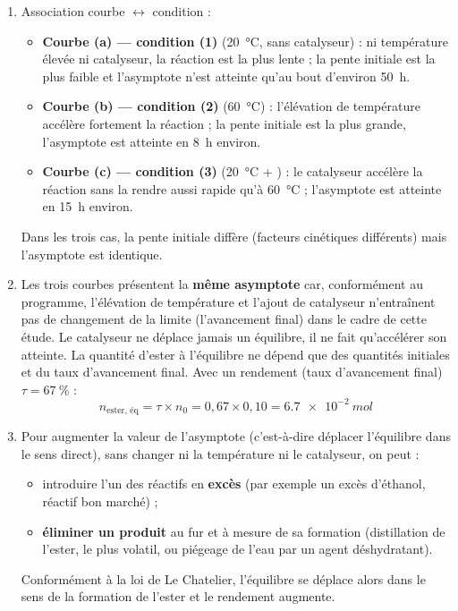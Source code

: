 \documentclass[11pt]{article}
\begin{document}
\begin{corrige}
\begin{enumerate}
\item Association courbe $\leftrightarrow$ condition :
\begin{itemize}
\item \textbf{Courbe (a) — condition (1)} (\SI{20}{\celsius}, sans catalyseur) : ni température élevée ni catalyseur, la réaction est la plus lente ; la pente initiale est la plus faible et l'asymptote n'est atteinte qu'au bout d'environ \SI{50}{h}.
\item \textbf{Courbe (b) — condition (2)} (\SI{60}{\celsius}) : l'élévation de température accélère fortement la réaction ; la pente initiale est la plus grande, l'asymptote est atteinte en \SI{8}{h} environ.
\item \textbf{Courbe (c) — condition (3)} (\SI{20}{\celsius} + ) : le catalyseur accélère la réaction sans la rendre aussi rapide qu'à \SI{60}{\celsius} ; l'asymptote est atteinte en \SI{15}{h} environ.
\end{itemize}
Dans les trois cas, la pente initiale diffère (facteurs cinétiques différents) mais l'asymptote est identique.
\item Les trois courbes présentent la \textbf{même asymptote} car, conformément au programme, l'élévation de température et l'ajout de catalyseur n'entraînent pas de changement de la limite (l'avancement final) dans le cadre de cette étude. Le catalyseur ne déplace jamais un équilibre, il ne fait qu'accélérer son atteinte. La quantité d'ester à l'équilibre ne dépend que des quantités initiales et du taux d'avancement final.
Avec un rendement (taux d'avancement final) $\tau = \SI{67}{\%}$ :
\[ n_{\text{ester, éq}} = \tau \times n_0 = 0,67 \times 0,10 = \SI{6,7e-2}{mol} \]
\item Pour augmenter la valeur de l'asymptote (c'est-à-dire déplacer l'équilibre dans le sens direct), sans changer ni la température ni le catalyseur, on peut :
\begin{itemize}
\item introduire l'un des réactifs en \textbf{excès} (par exemple un excès d'éthanol, réactif bon marché) ;
\item \textbf{éliminer un produit} au fur et à mesure de sa formation (distillation de l'ester, le plus volatil, ou piégeage de l'eau par un agent déshydratant).
\end{itemize}
Conformément à la loi de Le Chatelier, l'équilibre se déplace alors dans le sens de la formation de l'ester et le rendement augmente.
\end{enumerate}
\end{corrige}
\end{document}
